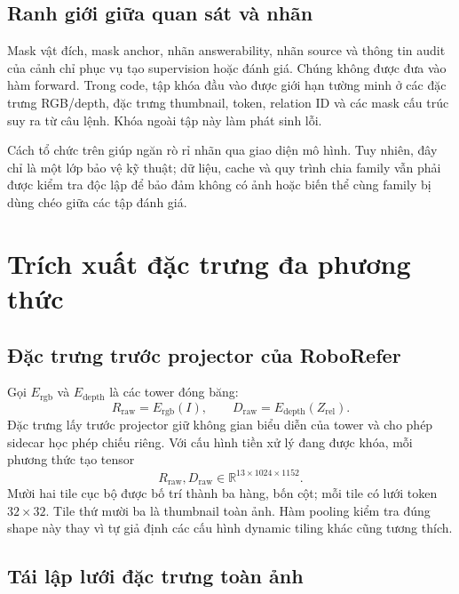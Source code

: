 \subsection{Ranh giới giữa quan sát và nhãn}

Mask vật đích, mask anchor, nhãn answerability, nhãn source và thông
tin audit của cảnh chỉ phục vụ tạo supervision hoặc đánh giá.
Chúng không được đưa vào hàm forward. Trong code, tập khóa đầu vào
được giới hạn tường minh ở các đặc trưng RGB/depth, đặc trưng thumbnail,
token, relation ID và các mask cấu trúc suy ra từ câu lệnh.
Khóa ngoài tập này làm phát sinh lỗi.

Cách tổ chức trên giúp ngăn rò rỉ nhãn qua giao diện mô hình. Tuy nhiên,
đây chỉ là một lớp bảo vệ kỹ thuật; dữ liệu, cache và quy trình chia
family vẫn phải được kiểm tra độc lập để bảo đảm không có ảnh hoặc
biến thể cùng family bị dùng chéo giữa các tập đánh giá.

\section{Trích xuất đặc trưng đa phương thức}
\label{sec:method-features}

\subsection{Đặc trưng trước projector của RoboRefer}

Gọi $E_{\mathrm{rgb}}$ và $E_{\mathrm{depth}}$ là các tower đóng băng:
\begin{equation}
    R_{\mathrm{raw}}=E_{\mathrm{rgb}}(I),\qquad
    D_{\mathrm{raw}}=E_{\mathrm{depth}}(Z_{\mathrm{rel}}).
\end{equation}
Đặc trưng lấy trước projector giữ không gian biểu diễn của tower và
cho phép sidecar học phép chiếu riêng. Với cấu hình tiền xử lý đang
được khóa, mỗi phương thức tạo tensor
\begin{equation}
    R_{\mathrm{raw}},D_{\mathrm{raw}}
    \in\mathbb{R}^{13\times1024\times1152}.
\end{equation}
Mười hai tile cục bộ được bố trí thành ba hàng, bốn cột;
mỗi tile có lưới token $32\times32$. Tile thứ mười ba là thumbnail
toàn ảnh. Hàm pooling kiểm tra đúng shape này thay vì tự giả định
các cấu hình dynamic tiling khác cũng tương thích.

\subsection{Tái lập lưới đặc trưng toàn ảnh}

